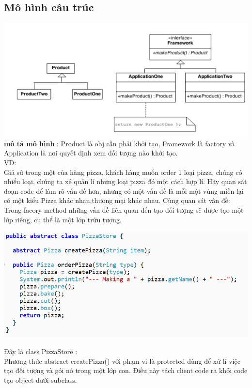 \subsection{Mô hình câu trúc}
\includegraphics{GALLEYS/images/chapter5/diagram1}\\
\textbf{mô tả mô hình} : Product là obj cần phải khởi tạo, Framework là factory và Application là nơi quyết định xem đối tượng nào khởi tạo.\\
VD:\\
Giả sử trong một của hàng pizza, khách hàng muốn order 1 loại pizza, chúng có nhiểu loại, chúng ta xé quản lí những loại pizza đó một cách hợp lí. Hãy quan sát đoạn code để làm rõ vấn đề hơn, nhưng có một vấn đề là mỗi một vùng miền lại có một kiểu Pizza khác nhau,thương mại khác nhau. Cùng quan sát vấn đề:\\

Trong facory method những vấn đề liên quan đến tạo đối tượng sẽ được tạo một lớp riêng, cụ thể là một lớp trừu tượng.\\

\begin{center}
	\includegraphics[width=1\columnwidth]{GALLEYS/images/chapter5/images1}
\end{center}
Đây là class PizzaStore :\\

Phương thức abstract createPizza() với phạm vi là protected dùng để xử lí việc tạo đối tượng và gói nó trong một lớp con. Điều này tách client code ra khỏi code tạo object dưới subclass.\\

